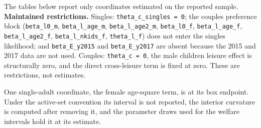 \documentclass[11pt,a4paper]{article}
\begin{document}
The tables below report only coordinates estimated on the reported sample. \textbf{Maintained restrictions.} Singles: \texttt{theta\_c\_singles\ =\ 0}; the couples preference block (\texttt{beta\_l0\_m}, \texttt{beta\_l\_age\_m}, \texttt{beta\_l\_age2\_m}, \texttt{beta\_l0\_f}, \texttt{beta\_l\_age\_f}, \texttt{beta\_l\_age2\_f}, \texttt{beta\_l\_nkids\_f}, \texttt{theta\_l\_f}) does not enter the singles likelihood; and \texttt{beta\_E\_y2015} and \texttt{beta\_E\_y2017} are absent because the 2015 and 2017 data are not used. Couples: \texttt{theta\_c\ =\ 0}, the male children leisure effect is structurally zero, and the direct cross-leisure term is fixed at zero. These are restrictions, not estimates.

One single-adult coordinate, the female age-square term, is at its box endpoint. Under the active-set convention its interval is not reported, the interior curvature is computed after removing it, and the parameter draws used for the welfare intervals hold it at its estimate.
\end{document}
